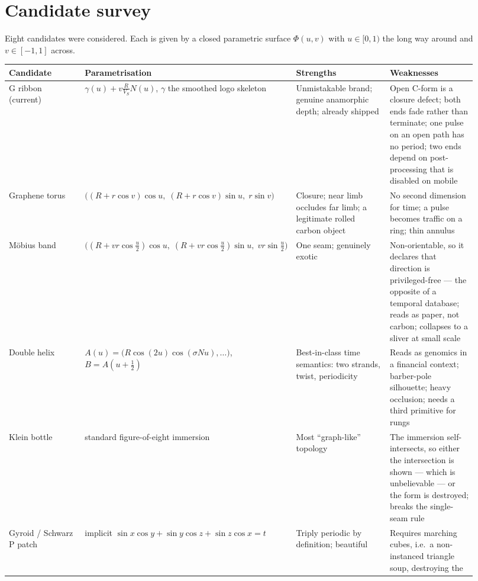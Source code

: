 \documentclass[11pt,a4paper]{article}
\theoremstyle{definition}
\begin{document}
\section{Candidate survey}

Eight candidates were considered. Each is given by a closed parametric surface
$\Phi(u,v)$ with $u\in[0,1)$ the long way around and $v\in[-1,1]$ across.

\begin{table}[htbp]
\centering
\small
\begin{tabular}{@{}p{0.19\linewidth}p{0.27\linewidth}p{0.24\linewidth}p{0.22\linewidth}@{}}
\toprule
\textbf{Candidate} & \textbf{Parametrisation} & \textbf{Strengths} & \textbf{Weaknesses} \\
\midrule
G ribbon (current) &
$\gamma(u)+v\frac{R}{V_S}N(u)$, $\gamma$ the smoothed logo skeleton &
Unmistakable brand; genuine anamorphic depth; already shipped &
Open C-form is a closure defect; both ends fade rather than terminate; one
pulse on an open path has no period; two ends depend on post-processing that is
disabled on mobile \\
\addlinespace
Graphene torus &
$\bigl((R+r\cos v)\cos u,\;(R+r\cos v)\sin u,\;r\sin v\bigr)$ &
Closure; near limb occludes far limb; a legitimate rolled carbon
object~\cite{geim2007} &
No second dimension for time; a pulse becomes traffic on a ring; thin annulus \\
\addlinespace
M\"obius band &
$\bigl((R+v r\cos\tfrac{u}{2})\cos u,\;(R+v r\cos\tfrac{u}{2})\sin u,\;v r\sin\tfrac{u}{2}\bigr)$ &
One seam; genuinely exotic &
Non-orientable, so it declares that direction is privileged-free --- the
opposite of a temporal database; reads as paper, not carbon; collapses to a
sliver at small scale \\
\addlinespace
Double helix &
$A(u)=\bigl(R\cos(2u)\cos(\sigma N u),\dots\bigr)$, $B=A(u+\tfrac12)$ &
Best-in-class time semantics: two strands, twist, periodicity &
Reads as genomics in a financial context; barber-pole silhouette; heavy
occlusion; needs a third primitive for rungs \\
\addlinespace
Klein bottle &
standard figure-of-eight immersion &
Most ``graph-like'' topology &
The immersion self-intersects, so either the intersection is shown --- which is
unbelievable --- or the form is destroyed; breaks the single-seam rule \\
\addlinespace
Gyroid / Schwarz P patch &
implicit $\sin x\cos y+\sin y\cos z+\sin z\cos x=t$ &
Triply periodic by definition; beautiful &
Requires marching cubes, i.e.\ a non-instanced triangle soup, destroying the

\end{tabular}
\end{table}
\end{document}
